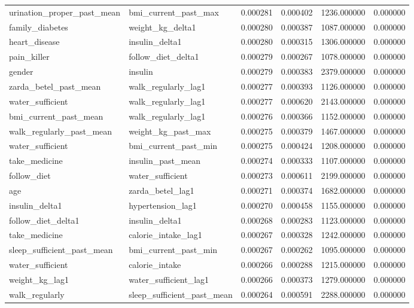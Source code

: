 \begin{longtable}{llrrrr}
urination\_proper\_past\_mean & bmi\_current\_past\_max & 0.000281 & 0.000402 & 1236.000000 & 0.000000 \\
family\_diabetes & weight\_kg\_delta1 & 0.000280 & 0.000387 & 1087.000000 & 0.000000 \\
heart\_disease & insulin\_delta1 & 0.000280 & 0.000315 & 1306.000000 & 0.000000 \\
pain\_killer & follow\_diet\_delta1 & 0.000279 & 0.000267 & 1078.000000 & 0.000000 \\
gender & insulin & 0.000279 & 0.000383 & 2379.000000 & 0.000000 \\
zarda\_betel\_past\_mean & walk\_regularly\_lag1 & 0.000277 & 0.000393 & 1126.000000 & 0.000000 \\
water\_sufficient & walk\_regularly\_lag1 & 0.000277 & 0.000620 & 2143.000000 & 0.000000 \\
bmi\_current\_past\_mean & walk\_regularly\_lag1 & 0.000276 & 0.000366 & 1152.000000 & 0.000000 \\
walk\_regularly\_past\_mean & weight\_kg\_past\_max & 0.000275 & 0.000379 & 1467.000000 & 0.000000 \\
water\_sufficient & bmi\_current\_past\_min & 0.000275 & 0.000424 & 1208.000000 & 0.000000 \\
take\_medicine & insulin\_past\_mean & 0.000274 & 0.000333 & 1107.000000 & 0.000000 \\
follow\_diet & water\_sufficient & 0.000273 & 0.000611 & 2199.000000 & 0.000000 \\
age & zarda\_betel\_lag1 & 0.000271 & 0.000374 & 1682.000000 & 0.000000 \\
insulin\_delta1 & hypertension\_lag1 & 0.000270 & 0.000458 & 1155.000000 & 0.000000 \\
follow\_diet\_delta1 & insulin\_delta1 & 0.000268 & 0.000283 & 1123.000000 & 0.000000 \\
take\_medicine & calorie\_intake\_lag1 & 0.000267 & 0.000328 & 1242.000000 & 0.000000 \\
sleep\_sufficient\_past\_mean & bmi\_current\_past\_min & 0.000267 & 0.000262 & 1095.000000 & 0.000000 \\
water\_sufficient & calorie\_intake & 0.000266 & 0.000288 & 1215.000000 & 0.000000 \\
weight\_kg\_lag1 & water\_sufficient\_lag1 & 0.000266 & 0.000373 & 1279.000000 & 0.000000 \\
walk\_regularly & sleep\_sufficient\_past\_mean & 0.000264 & 0.000591 & 2288.000000 & 0.000000 \\

\end{longtable}
